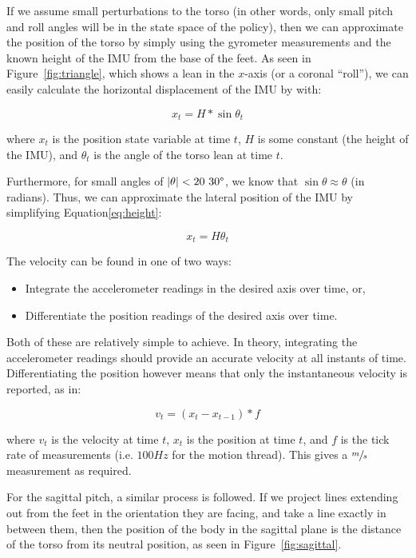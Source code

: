 If we assume small perturbations to the torso (in other words, only small pitch and roll angles will be in the state space of the policy), then we can approximate the position of the torso by simply using the gyrometer measurements and the known height of the IMU from the base of the feet. As seen in Figure~\ref{fig:triangle}, which shows a lean in the $x$-axis (or a coronal ``roll''), we can easily calculate the horizontal displacement of the IMU by with: 

\begin{equation} \label{eq:height}
x_t = H * \sin{\theta_t}
\end{equation}

where $x_t$ is the position state variable at time $t$, $H$ is some constant (the height of the IMU), and $\theta_t$ is the angle of the torso lean at time $t$.

Furthermore, for small angles of $|\theta| < 20~30\degree$, we know that $\sin{\theta} \approx \theta$ (in radians). Thus, we can approximate the lateral position of the IMU by simplifying Equation\ref{eq:height}:

\begin{equation} \label{eq:simplified}
x_t = H\theta_t
\end{equation}

The velocity can be found in one of two ways:
\begin{itemize}
\item Integrate the accelerometer readings in the desired axis over time, or,
\item Differentiate the position readings of the desired axis over time.
\end{itemize}

Both of these are relatively simple to achieve. In theory, integrating the accelerometer readings should provide an accurate velocity at all instants of time. Differentiating the position however means that only the instantaneous velocity is reported, as in:

\begin{equation}
v_t = (x_t - x_{t-1}) * f
\end{equation}

where $v_t$ is the velocity at time $t$, $x_t$ is the position at time $t$, and $f$ is the tick rate of measurements (i.e. $100Hz$ for the motion thread). This gives a $\sfrac{m}{s}$ measurement as required.

For the sagittal pitch, a similar process is followed. If we project lines extending out from the feet in the orientation they are facing, and take a line exactly in between them, then the position of the body in the sagittal plane is the distance of the torso from its neutral position, as seen in Figure~\ref{fig:sagittal}.

